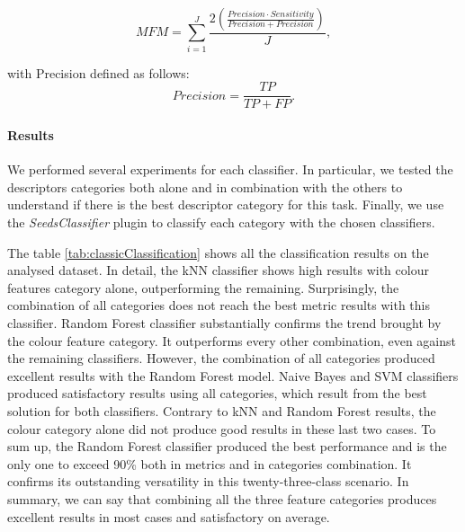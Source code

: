\documentclass[twocolumn]{svjour3}           %
\begin{document}
\begin{equation}
	MFM = \sum_{i=1}^J \dfrac{2 (\frac{Precision \cdot Sensitivity}{Precision+Precision})}{J} ,
\end{equation}

with Precision defined as follows: 
\begin{equation}
	Precision = \frac{TP}{TP+FP} .
\end{equation}

\paragraph{Results}
\label{par:results}
We performed several experiments for each classifier. In particular, we tested the descriptors categories both alone and in combination with the others to understand if there is the best descriptor category for this task. Finally, we use the \emph{SeedsClassifier} plugin to classify each category with the chosen classifiers.

The table \ref{tab:classicClassification} shows all the classification results on the analysed dataset.
In detail, the kNN classifier shows high results with colour features category alone, outperforming the remaining. Surprisingly, the combination of all categories does not reach the best metric results with this classifier.
Random Forest classifier substantially confirms the trend brought by the colour feature category. It outperforms every other combination, even against the remaining classifiers. However, the combination of all categories produced excellent results with the Random Forest model.
Naive Bayes and SVM classifiers produced satisfactory results using all categories, which result from the best solution for both classifiers. Contrary to kNN and Random Forest results, the colour category alone did not produce good results in these last two cases.
To sum up, the Random Forest classifier produced the best performance and is the only one to exceed 90\% both in metrics and in categories combination. It confirms its outstanding versatility in this twenty-three-class scenario. 
In summary, we can say that combining all the three feature categories produces excellent results in most cases and satisfactory on average.
\end{document}
